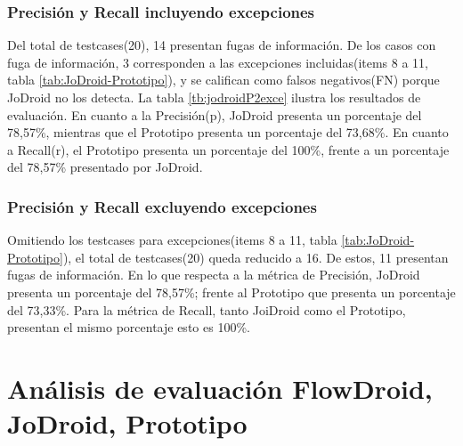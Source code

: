 \subsubsection{Precisión y Recall incluyendo excepciones}
Del total de testcases(20), 14 presentan fugas de información. 
De los casos con fuga de información, 3 corresponden a las excepciones
incluidas(items 8 a 11, tabla \ref{tab:JoDroid-Prototipo}), y se califican como
falsos negativos(FN) porque JoDroid no los detecta. La tabla
\ref{tb:jodroidP2exce} ilustra los resultados de evaluación.\newline 
En cuanto a la Precisión(p), JoDroid presenta un porcentaje del 78,57\%,
mientras que el Prototipo presenta un porcentaje del  73,68\%.\newline
En cuanto a Recall(r), el Prototipo presenta un porcentaje del 100\%, frente a
un porcentaje del 78,57\% presentado por JoDroid.

\subsubsection{Precisión y Recall excluyendo excepciones}
Omitiendo los testcases para excepciones(items 8 a 11, tabla
\ref{tab:JoDroid-Prototipo}), el total de testcases(20) queda reducido a 16. 
De estos, 11 presentan fugas de información.\newline 
En lo que respecta a la métrica de Precisión, JoDroid presenta un porcentaje del
78,57\%; frente al Prototipo que presenta un porcentaje del 73,33\%.\newline 
Para la métrica de Recall, tanto JoiDroid como el Prototipo, presentan el mismo
porcentaje esto es 100\%.\newline



\section{Análisis de evaluación FlowDroid, JoDroid, Prototipo}
\label{subsec:fjp}


